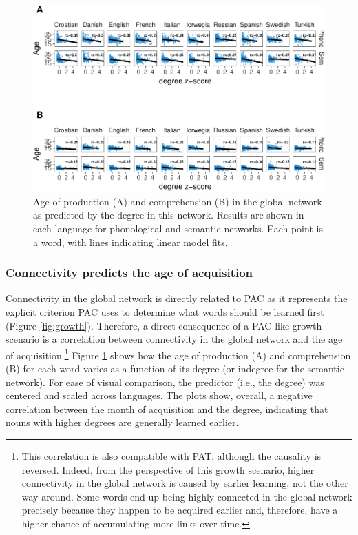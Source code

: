 \documentclass[english,floatsintext,man]{apa6}
\theoremstyle{definition}
\theoremstyle{definition}
\theoremstyle{definition}
\theoremstyle{remark}
\begin{document}
\begin{figure}[!h]
\includegraphics[width=\textwidth]{ms_files/figure-latex/corrAll-1} \caption{Age of production (A) and comprehension (B) in the global network as predicted by the degree in this network. Results are shown in each language for phonological and semantic networks. Each point is a word, with lines indicating linear model fits.}\label{fig:corrAll}
\end{figure}

\subsubsection{Connectivity predicts the age of
acquisition}\label{connectivity-predicts-the-age-of-acquisition}

Connectivity in the global network is directly related to PAC as it
represents the explicit criterion PAC uses to determine what words
should be learned first (Figure \ref{fig:growth}). Therefore, a direct
consequence of a PAC-like growth scenario is a correlation between
connectivity in the global network and the age of
acquisition.\footnote{This correlation is also compatible with PAT, although the causality is reversed. Indeed, from the perspective of this growth scenario, higher connectivity in the global network is caused by earlier learning, not the other way around. Some words end up being highly connected in the global network precisely because they happen to be acquired earlier and, therefore, have a higher chance of accumulating more links over time.}
Figure \ref{fig:corrAll} shows how the age of production (A) and
comprehension (B) for each word varies as a function of its degree (or
indegree for the semantic network). For ease of visual comparison, the
predictor (i.e., the degree) was centered and scaled across languages.
The plots show, overall, a negative correlation between the month of
acquisition and the degree, indicating that nouns with higher degrees
are generally learned earlier.
\end{document}
